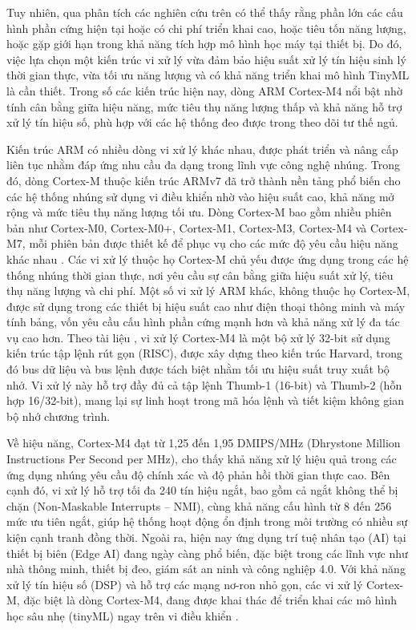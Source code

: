 Tuy nhiên, qua phân tích các nghiên cứu trên có thể thấy rằng phần 
lớn các cấu hình phần cứng hiện tại hoặc có chi phí triển khai cao, 
hoặc tiêu tốn năng lượng, hoặc gặp giới hạn trong khả năng tích hợp mô 
hình học máy tại thiết bị. Do đó, việc lựa chọn một kiến trúc vi xử lý 
vừa đảm bảo hiệu suất xử lý tín hiệu sinh lý thời gian thực, vừa tối 
ưu năng lượng và có khả năng triển khai mô hình TinyML là cần thiết. 
Trong số các kiến trúc hiện nay, dòng ARM Cortex-M4 nổi bật nhờ tính 
cân bằng giữa hiệu năng, mức tiêu thụ năng lượng thấp và khả năng hỗ 
trợ xử lý tín hiệu số, phù hợp với các hệ thống đeo được trong theo 
dõi tư thế ngủ.


Kiến trúc ARM có nhiều dòng vi xử lý khác nhau, được phát triển và nâng
cấp liên tục nhằm đáp ứng nhu cầu đa dạng trong lĩnh vực công nghệ nhúng. 
Trong đó, dòng Cortex-M thuộc kiến trúc ARMv7 đã trở thành nền tảng phổ 
biến cho các hệ thống nhúng sử dụng vi điều khiển nhờ vào hiệu suất cao, 
khả năng mở rộng và mức tiêu thụ năng lượng tối ưu. Dòng Cortex-M bao 
gồm nhiều phiên bản như Cortex-M0, Cortex-M0+, Cortex-M1, Cortex-M3, 
Cortex-M4 và Cortex-M7, mỗi phiên bản được thiết kế để phục vụ cho các mức 
độ yêu cầu hiệu năng khác nhau \cite{arm_cortex_m_comparison}. 
Các vi xử lý thuộc họ Cortex-M chủ yếu được ứng dụng trong các hệ thống 
nhúng thời gian thực, nơi yêu cầu sự cân bằng giữa hiệu suất xử lý, tiêu 
thụ năng lượng và chi phí. Một số vi xử lý ARM khác, không thuộc họ 
Cortex-M, được sử dụng trong các thiết bị hiệu suất cao như điện thoại 
thông minh và máy tính bảng, vốn yêu cầu cấu hình phần cứng mạnh hơn và 
khả năng xử lý đa tác vụ cao hơn.
Theo tài liệu \cite{cortexM4}, vi xử lý Cortex-M4 là một bộ xử lý 32-bit 
sử dụng kiến trúc tập lệnh rút gọn (RISC), được xây dựng theo kiến trúc 
Harvard, trong đó bus dữ liệu và bus lệnh được tách biệt nhằm tối ưu 
hiệu suất truy xuất bộ nhớ. Vi xử lý này hỗ trợ đầy đủ cả tập lệnh 
Thumb-1 (16-bit) và Thumb-2 (hỗn hợp 16/32-bit), mang lại sự linh hoạt 
trong mã hóa lệnh và tiết kiệm không gian bộ nhớ chương trình.

Về hiệu năng, Cortex-M4 đạt từ 1,25 đến 1,95 DMIPS/MHz (Dhrystone Million Instructions Per Second per MHz), cho thấy khả năng xử lý hiệu quả trong các ứng dụng nhúng yêu cầu độ chính xác và độ phản hồi thời gian thực cao. Bên cạnh đó, vi xử lý hỗ trợ tối đa 240 tín hiệu ngắt, bao gồm cả ngắt không thể bị chặn (Non-Maskable Interrupts – NMI), cùng khả năng cấu hình từ 8 đến 256 mức ưu tiên ngắt, giúp hệ thống hoạt động ổn định trong môi trường có nhiều sự kiện cạnh tranh đồng thời.
Ngoài ra, hiện nay ứng dụng trí tuệ nhân tạo (AI) tại thiết bị biên (Edge AI) đang ngày càng phổ biến, đặc biệt trong các lĩnh vực như nhà thông minh, thiết bị đeo, giám sát an ninh và công nghiệp 4.0. Với khả năng xử lý tín hiệu số (DSP) và hỗ trợ các mạng nơ-ron nhỏ gọn, các vi xử lý Cortex-M, đặc biệt là dòng Cortex-M4, đang được khai thác để triển khai các mô hình học sâu nhẹ (tinyML) ngay trên vi điều khiển \cite{electronics11162545}\cite{applicationCortexM4}.


